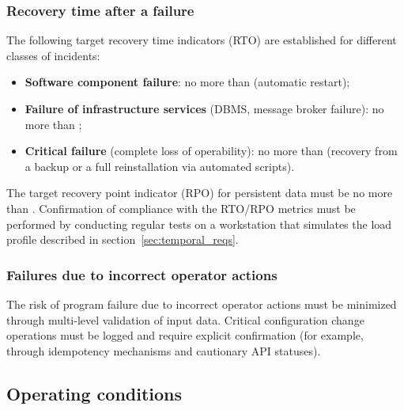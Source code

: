 \documentclass[12pt,a4paper]{extarticle}
\begin{document}
\subsubsection{Recovery time after a failure}

\begin{hseExample}
The following target recovery time indicators (RTO) are established for different classes of incidents:
\begin{itemize}[nosep, leftmargin=1.25cm]
    \item \textbf{Software component failure}: no more than  (automatic restart);
    \item \textbf{Failure of infrastructure services} (DBMS, message broker failure): no more than ;
    \item \textbf{Critical failure} (complete loss of operability): no more than  (recovery from a backup or a full reinstallation via automated scripts).
\end{itemize}

The target recovery point indicator (RPO) for persistent data must be no more than . Confirmation of compliance with the RTO/RPO metrics must be performed by conducting regular tests on a workstation that simulates the load profile described in section~\ref{sec:temporal_reqs}.
\end{hseExample}

\subsubsection{Failures due to incorrect operator actions}

\begin{hseExample}
The risk of program failure due to incorrect operator actions must be minimized through multi-level validation of input data. Critical configuration change operations must be logged and require explicit confirmation (for example, through idempotency mechanisms and cautionary API statuses).
\end{hseExample}

\clearpage

\subsection{Operating conditions}
\end{document}
